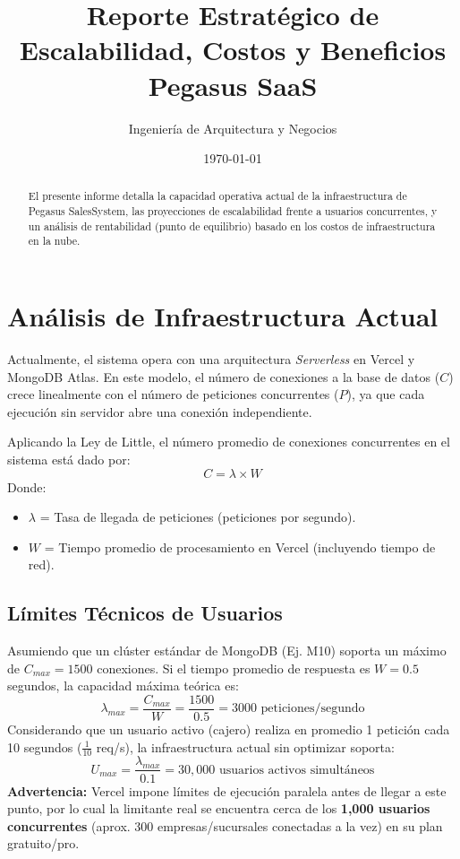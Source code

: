 \documentclass[12pt,a4paper]{article}
\title{\textbf{Reporte Estratégico de Escalabilidad, Costos y Beneficios} \\ \Large Pegasus SaaS}
\author{Ingeniería de Arquitectura y Negocios}
\date{\today}
\begin{document}
\maketitle

\begin{abstract}
El presente informe detalla la capacidad operativa actual de la infraestructura de Pegasus SalesSystem, las proyecciones de escalabilidad frente a usuarios concurrentes, y un análisis de rentabilidad (punto de equilibrio) basado en los costos de infraestructura en la nube.
\end{abstract}

\section{Análisis de Infraestructura Actual}
Actualmente, el sistema opera con una arquitectura \textit{Serverless} en Vercel y MongoDB Atlas. En este modelo, el número de conexiones a la base de datos ($C$) crece linealmente con el número de peticiones concurrentes ($P$), ya que cada ejecución sin servidor abre una conexión independiente.

Aplicando la Ley de Little, el número promedio de conexiones concurrentes en el sistema está dado por:
\begin{equation}
    C = \lambda \times W
\end{equation}
Donde:
\begin{itemize}
    \item $\lambda$ = Tasa de llegada de peticiones (peticiones por segundo).
    \item $W$ = Tiempo promedio de procesamiento en Vercel (incluyendo tiempo de red).
\end{itemize}

\subsection{Límites Técnicos de Usuarios}
Asumiendo que un clúster estándar de MongoDB (Ej. M10) soporta un máximo de $C_{max} = 1500$ conexiones. Si el tiempo promedio de respuesta es $W = 0.5$ segundos, la capacidad máxima teórica es:
\begin{equation}
    \lambda_{max} = \frac{C_{max}}{W} = \frac{1500}{0.5} = 3000 \text{ peticiones/segundo}
\end{equation}
Considerando que un usuario activo (cajero) realiza en promedio 1 petición cada 10 segundos ($\frac{1}{10}$ req/s), la infraestructura actual sin optimizar soporta:
\begin{equation}
    U_{max} = \frac{\lambda_{max}}{0.1} = 30,000 \text{ usuarios activos simultáneos}
\end{equation}
\textbf{Advertencia:} Vercel impone límites de ejecución paralela antes de llegar a este punto, por lo cual la limitante real se encuentra cerca de los \textbf{1,000 usuarios concurrentes} (aprox. 300 empresas/sucursales conectadas a la vez) en su plan gratuito/pro.
\end{document}
